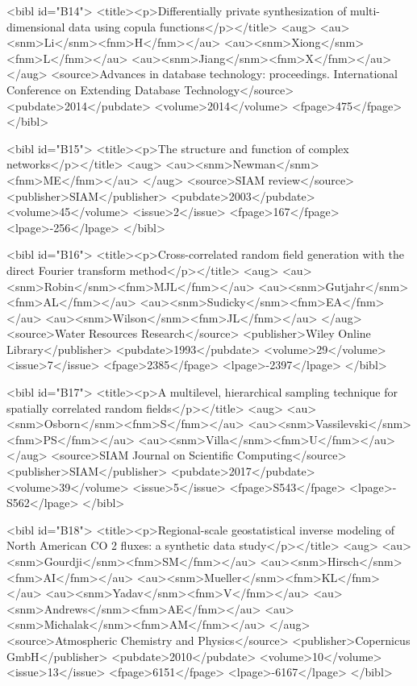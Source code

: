 \documentclass{bmcart}
\begin{document}
\begin{backmatter}
{<bibl id="B14">
  <title><p>Differentially private synthesization of multi-dimensional data
  using copula functions</p></title>
  <aug>
    <au><snm>Li</snm><fnm>H</fnm></au>
    <au><snm>Xiong</snm><fnm>L</fnm></au>
    <au><snm>Jiang</snm><fnm>X</fnm></au>
  </aug>
  <source>Advances in database technology: proceedings. International
  Conference on Extending Database Technology</source>
  <pubdate>2014</pubdate>
  <volume>2014</volume>
  <fpage>475</fpage>
</bibl>

<bibl id="B15">
  <title><p>The structure and function of complex networks</p></title>
  <aug>
    <au><snm>Newman</snm><fnm>ME</fnm></au>
  </aug>
  <source>SIAM review</source>
  <publisher>SIAM</publisher>
  <pubdate>2003</pubdate>
  <volume>45</volume>
  <issue>2</issue>
  <fpage>167</fpage>
  <lpage>-256</lpage>
</bibl>

<bibl id="B16">
  <title><p>Cross-correlated random field generation with the direct Fourier
  transform method</p></title>
  <aug>
    <au><snm>Robin</snm><fnm>MJL</fnm></au>
    <au><snm>Gutjahr</snm><fnm>AL</fnm></au>
    <au><snm>Sudicky</snm><fnm>EA</fnm></au>
    <au><snm>Wilson</snm><fnm>JL</fnm></au>
  </aug>
  <source>Water Resources Research</source>
  <publisher>Wiley Online Library</publisher>
  <pubdate>1993</pubdate>
  <volume>29</volume>
  <issue>7</issue>
  <fpage>2385</fpage>
  <lpage>-2397</lpage>
</bibl>

<bibl id="B17">
  <title><p>A multilevel, hierarchical sampling technique for spatially
  correlated random fields</p></title>
  <aug>
    <au><snm>Osborn</snm><fnm>S</fnm></au>
    <au><snm>Vassilevski</snm><fnm>PS</fnm></au>
    <au><snm>Villa</snm><fnm>U</fnm></au>
  </aug>
  <source>SIAM Journal on Scientific Computing</source>
  <publisher>SIAM</publisher>
  <pubdate>2017</pubdate>
  <volume>39</volume>
  <issue>5</issue>
  <fpage>S543</fpage>
  <lpage>-S562</lpage>
</bibl>

<bibl id="B18">
  <title><p>Regional-scale geostatistical inverse modeling of North American CO
  2 fluxes: a synthetic data study</p></title>
  <aug>
    <au><snm>Gourdji</snm><fnm>SM</fnm></au>
    <au><snm>Hirsch</snm><fnm>AI</fnm></au>
    <au><snm>Mueller</snm><fnm>KL</fnm></au>
    <au><snm>Yadav</snm><fnm>V</fnm></au>
    <au><snm>Andrews</snm><fnm>AE</fnm></au>
    <au><snm>Michalak</snm><fnm>AM</fnm></au>
  </aug>
  <source>Atmospheric Chemistry and Physics</source>
  <publisher>Copernicus GmbH</publisher>
  <pubdate>2010</pubdate>
  <volume>10</volume>
  <issue>13</issue>
  <fpage>6151</fpage>
  <lpage>-6167</lpage>
</bibl>

}
\end{backmatter}
\end{document}
